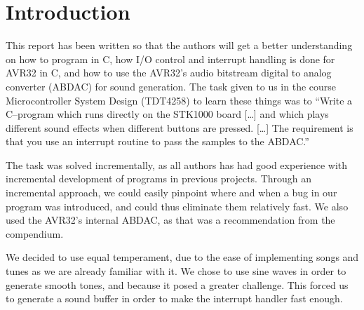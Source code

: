 \section{Introduction}

This report has been written so that the authors will get a better
understanding on how to program in C, how I/O control and interrupt
handling is done for AVR32 in C, and how to use the AVR32's audio
bitstream digital to analog converter (ABDAC) for sound generation. The
task given to us in the course Microcontroller System Design (TDT4258)
to learn these things was to ``Write a C–program which runs
directly on the STK1000 board [\ldots] and which plays different sound
effects when different buttons are pressed. [\ldots] The requirement is
that you use an interrupt routine to pass the samples to the ABDAC.''\cite{comp}

The task was solved incrementally, as all authors has had good experience
with incremental development of programs in previous projects. Through
an incremental approach, we could easily pinpoint where and when a bug
in our program was introduced, and could thus eliminate them relatively
fast. We also used the AVR32's internal ABDAC, as that was a
recommendation from the compendium.

We decided to use equal temperament, due to the ease of implementing
songs and tunes as we are already familiar with it. We chose to use sine
waves in order to generate smooth tones, and because it posed a greater
challenge. This forced us to generate a sound buffer in order to make
the interrupt handler fast enough.
